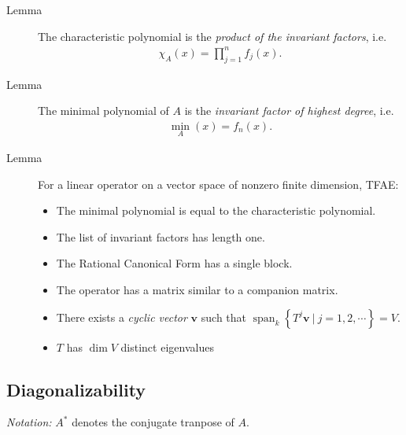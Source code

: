 \begin{description}
\item[Lemma]
The characteristic polynomial is the \emph{product of the invariant
factors}, i.e.
\begin{align*}
\chi_A(x) = \prod_{j=1}^n f_j(x)
.\end{align*}
\item[Lemma]
The minimal polynomial of \(A\) is the \emph{invariant factor of highest
degree}, i.e.
\begin{align*}
\min_A(x) = f_n(x)
.\end{align*}
\item[Lemma]
For a linear operator on a vector space of nonzero finite dimension,
TFAE:

\begin{itemize}
\item
  The minimal polynomial is equal to the characteristic polynomial.
\item
  The list of invariant factors has length one.
\item
  The Rational Canonical Form has a single block.
\item
  The operator has a matrix similar to a companion matrix.
\item
  There exists a \emph{cyclic vector} \(\mathbf{v}\) such that
  \({\operatorname{span}}_k\left\{{T^j \mathbf{v} {~\mathrel{\Big|}~}j = 1, 2, \cdots}\right\} = V.\)
\item
  \(T\) has \(\dim V\) distinct eigenvalues
\end{itemize}
\end{description}

\hypertarget{diagonalizability}{%
\subsection{Diagonalizability}\label{diagonalizability}}

\emph{Notation:} \(A^*\) denotes the conjugate tranpose of \(A\).

